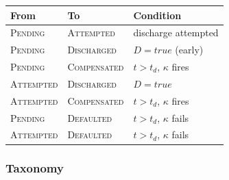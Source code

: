 \begin{center}
\small
\begin{tabular}{l l l}
\toprule
\textbf{From} & \textbf{To} & \textbf{Condition} \\
\midrule
\textsc{Pending}   & \textsc{Attempted}   & discharge attempted \\
\textsc{Pending}   & \textsc{Discharged}  & $D = \mathit{true}$ (early) \\
\textsc{Pending}   & \textsc{Compensated} & $t > t_d$, $\kappa$ fires \\
\textsc{Attempted} & \textsc{Discharged}  & $D = \mathit{true}$ \\
\textsc{Attempted} & \textsc{Compensated} & $t > t_d$, $\kappa$ fires \\
\textsc{Pending}   & \textsc{Defaulted}   & $t > t_d$, $\kappa$ fails \\
\textsc{Attempted} & \textsc{Defaulted}   & $t > t_d$, $\kappa$ fails \\
\bottomrule
\end{tabular}
\end{center}

\subsubsection{Taxonomy}
\label{sec:obligation-taxonomy}

